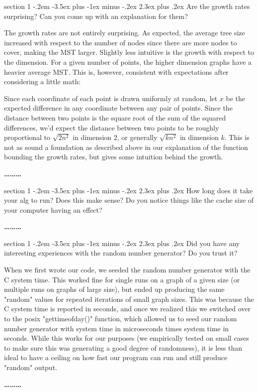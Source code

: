 \documentclass[12pt]{article}
\makeatletter
\newenvironment{problem}{\@startsection
       {section}
       {1}
       {-.2em}
       {-3.5ex plus -1ex minus -.2ex}
       {2.3ex plus .2ex}
       {\pagebreak[3]%
       \large\bf\noindent{Problem }
       }
       }
       {%
       \begin{center}\large\bf \ldots\ldots\ldots\end{center}}
\makeatother
\begin{document}
\begin{problem}{}
Are the growth rates surprising? Can you come up with an explanation
for them?

The growth rates are not entirely surprising.  As expected, the average tree size increased with respect to the number of nodes since there are more nodes to cover, making the MST larger.  Slightly less intuitive is the growth with respect to the dimension.  For a given number of points, the higher dimension graphs have a heavier average MST.  This is, however, consistent with expectations after considering a little math:

Since each coordinate of each point is drawn uniformly at random, let $x$ be the expected difference in any coordinate between any pair of points.  Since the distance between two points is the square root of the sum of the squared differences, we'd expect the distance between two points to be roughly proportional to $\sqrt{2n^2}$ in dimension 2, or generally $\sqrt{kn^2}$ in dimension $k$.  This is not as sound a foundation as described above in our explanation of the function bounding the growth rates, but gives some intuition behind the growth.

\end{problem}

\begin{problem}{}
How long does it take your alg to run? Does this make sense? Do you
notice things like the cache size of your computer having an effect?

\end{problem}

\begin{problem}{}
Did you have any interesting experiences with the random number
generator? Do you trust it?

When we first wrote our code, we seeded the random number generator with the C system time.  This worked fine for single runs on a graph of a given size (or multiple runs on graphs of large size), but ended up producing the same "random" values for repeated iterations of small graph sizes.  This was because the C system time is reported in seconds, and once we realized this we switched over to the posix "gettimeofday()" function, which allowed us to seed our random number generator with system time in microseconds times system time in seconds.  While this works for our purposes (we empirically tested on small cases to make sure this was generating a good degree of randomness), it is less than ideal to have a ceiling on how fast our program can run and still produce "random" output.  

\end{problem}

\end{document}
